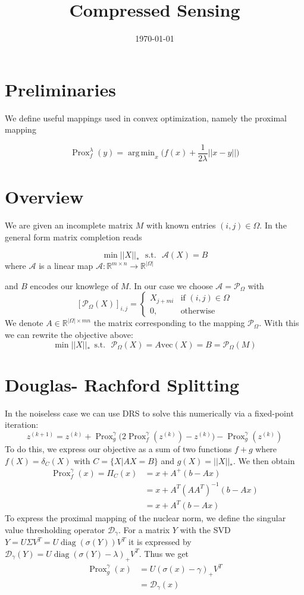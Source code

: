 \documentclass{article}
\title{Compressed Sensing}
\date{\today}
\numberwithin{equation}{section}
\DeclareMathOperator*{\argmin}{arg\,min}
\DeclareMathOperator{\Prox}{Prox}
\DeclareMathOperator{\diag}{diag}
\begin{document}
\maketitle

\section{Preliminaries}

We define useful mappings used in convex optimization, namely the proximal mapping

$$\Prox_f^\lambda(y) = \argmin_x \Big( f(x) + \frac{1}{2 \lambda} || x - y|| \Big)$$

\section{Overview}
We are given an incomplete matrix $M$ with known entries $(i,j) \in \Omega$. In the general form matrix completion reads

$$\min ||X||_* \ \ \ \text{s.t.} \ \ \ \mathcal{A}(X) = B$$
where $\mathcal{A}$ is a linear map $\mathcal{A}:\mathbb{R}^{m \times n} \longrightarrow \mathbb{R}^{|\Omega|}$

and $B$ encodes our knowlege of $M$.
In our case we choose $ \mathcal{A} = \mathcal{P}_\Omega$ with
$$
[\mathcal{P}_\Omega(X)]_{i,j}= 
\begin{cases}
    X_{j+mi} & \text{if } (i,j) \in \Omega\\
    0,              & \text{otherwise}
\end{cases}
$$
We denote $A \in \mathbb{R}^{|\Omega| \times mn}$ the matrix corresponding to the mapping $\mathcal{P}_\Omega$. 
With this we can rewrite the objective above:
$$\min ||X||_* \ \ \text{s.t.} \ \ \ \mathcal{P}_\Omega(X) = A\text{vec}(X) = B = \mathcal{P}_\Omega(M)$$
\section{Douglas- Rachford Splitting}
In the noiseless case we can use DRS to solve this numerically via a fixed-point iteration: 
$$z^{(k+1)} = z^{(k)} + \Prox_{g}^\gamma\Big(2 \Prox_{f}^\gamma(z^{(k)}) - z^{(k)}\Big) - \Prox_{g}^\gamma(z^{(k)})$$
To do this, we express our objective as a sum of two functions $f + g$ where $f(X) = \delta_C(X)$ with $C = \lbrace X | AX = B \rbrace$ and $g(X) = ||X||_*$. We then obtain
\begin{align*}
\Prox_{f}^\gamma(x) = \Pi_C(x) &= x + A^+(b-Ax)
\\ &= x + A^T(A A^T)^{-1}(b - Ax)
\\ &= x + A^T(b-Ax)
\end{align*}
To express the proximal mapping of the nuclear norm, we define the singular value thresholding operator $\mathcal{D}_\gamma$. For a matrix $Y$ with the SVD
$Y = U \Sigma V^T = U \diag(\sigma(Y)) V^T$ it is expressed by $\mathcal{D}_\gamma (Y) = U \diag(\sigma(Y) - \lambda)_+ V^T$. Thus we get
\begin{align*}
\Prox_{g}^\gamma(x) &= U (\sigma(x) - \gamma)_{+} V^T
\\ &= \mathcal{D}_\gamma(x)
\end{align*}
\end{document}
